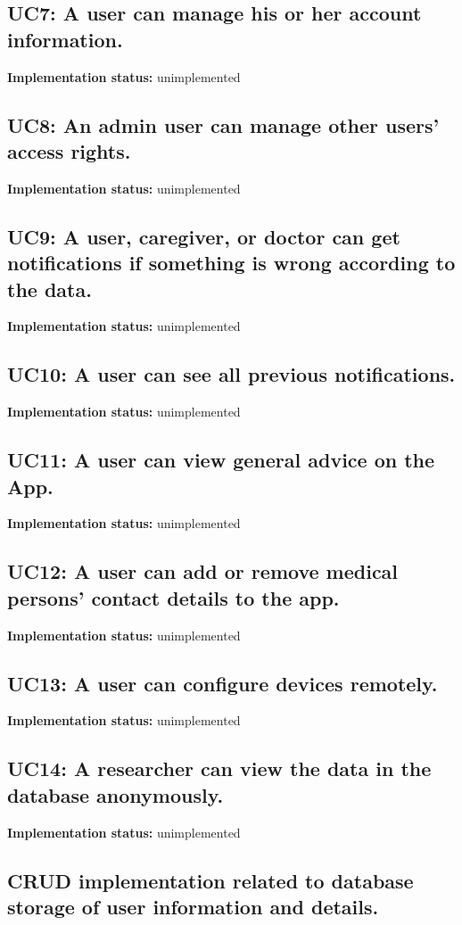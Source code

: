 \documentclass[12pt]{article}
\begin{document}
{	\subsection{UC7: A user can manage his or her account information.}
	\textbf{Implementation status:} unimplemented

	\subsection{UC8: An admin user can manage other users' access rights.}
	\textbf{Implementation status:} unimplemented


	\subsection{UC9: A user, caregiver, or doctor can get notifications if something is wrong according to the data.}
	\textbf{Implementation status:} unimplemented


	\subsection{UC10: A user can see all previous notifications.}
	\textbf{Implementation status:} unimplemented

	\subsection{UC11: A user can view general advice on the App.}
	\textbf{Implementation status:} unimplemented

	\subsection{UC12: A user can add or remove medical persons' contact details to the app.}
	\textbf{Implementation status:} unimplemented

	\subsection{UC13: A user can configure devices remotely.}
	\textbf{Implementation status:} unimplemented


	\subsection{UC14: A researcher can view the data in the database anonymously.}
	\textbf{Implementation status:} unimplemented

	\subsection{CRUD implementation related to database storage of user information and details.}
}
\end{document}
